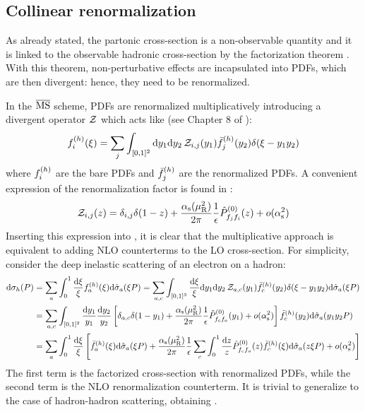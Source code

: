 \subsection{Collinear renormalization}
\label{ssec:coll-ren}

As already stated, the partonic cross-section is a non-observable quantity and it is linked to the observable hadronic cross-section by the factorization theorem . With this theorem, non-perturbative effects are incapsulated into PDFs, which are then divergent: hence, they need to be renormalized.

In the $ \overline{\text{MS}} $ scheme, PDFs are renormalized multiplicatively introducing a divergent operator $ \mathcal{Z} $ which acts like (see Chapter 8 of \cite{Collins-2011}):
\begin{equation}
  f_{i}^{(h)}(\xi) = \sum_j \int_{[0,1]^2} \mathrm{d} y_1 \mathrm{d} y_2 \, \mathcal{Z}_{i,j}(y_1) \bar{f}_{j}^{(h)}(y_2) \delta(\xi - y_1 y_2)
\end{equation}
where $ f_{i}^{(h)} $ are the bare PDFs and $ \bar{f}_{j}^{(h)} $ are the renormalized PDFs. A convenient expression of the renormalization factor is found in \cite{Curci-1980}:
\begin{equation}
  \mathcal{Z}_{i,j}(z) = \delta_{i,j} \delta(1-z) + \frac{\alpha_\text{s}(\mu_\text{R}^2)}{2\pi} \frac{1}{\epsilon} \hat{P}^{(0)}_{f_j f_i}(z) + o(\alpha_\text{s}^2)
  \label{eq:z-op-def}
\end{equation}
Inserting this expression into , it is clear that the multiplicative approach is equivalent to adding NLO counterterms to the LO cross-section. For simplicity, consider the deep inelastic scattering of an electron on a hadron:
\begin{equation*}
  \begin{split}
    \mathrm{d}\sigma_h(P)
    & = \sum_a \int_0^1 \frac{\mathrm{d} \xi}{\xi} f_{a}^{(h)}(\xi) \mathrm{d}\hat{\sigma}_a(\xi P) = \sum_{a,c} \int_{[0,1]^3} \frac{\mathrm{d} \xi}{\xi} \mathrm{d} y_1 \mathrm{d} y_2 \, \mathcal{Z}_{a,c}(y_1) \bar{f}_{c}^{(h)}(y_2) \delta(\xi - y_1 y_2) \mathrm{d}\hat{\sigma}_a(\xi P) \\
    & = \sum_{a,c} \int_{[0,1]^2} \frac{\mathrm{d} y_1}{y_1} \frac{\mathrm{d} y_2}{y_2} \left[ \delta_{a,c} \delta(1 - y_1) + \frac{\alpha_\text{s}(\mu_\text{R}^2)}{2\pi} \frac{1}{\epsilon} \hat{P}^{(0)}_{f_c f_a}(y_1) + o(\alpha_\text{s}^2) \right] \bar{f}_{c}^{(h)}(y_2) \mathrm{d}\hat{\sigma}_a(y_1 y_2 P) \\
    & = \sum_a \int_0^1 \frac{\mathrm{d} \xi}{\xi} \left[ \bar{f}_{a}^{(h)}(\xi) \mathrm{d}\hat{\sigma}_a(\xi P) + \frac{\alpha_\text{s}(\mu_\text{R}^2)}{2\pi} \frac{1}{\epsilon} \sum_{c} \int_0^1 \frac{\mathrm{d} z}{z} \hat{P}^{(0)}_{f_c f_a}(z) \bar{f}_{c}^{(h)}(\xi) \mathrm{d}\hat{\sigma}_a(z \xi P) + o(\alpha_\text{s}^2) \right]
  \end{split}
\end{equation*}
The first term is the factorized cross-section with renormalized PDFs, while the second term is the NLO renormalization counterterm. It is trivial to generalize to the case of hadron-hadron scattering, obtaining .

